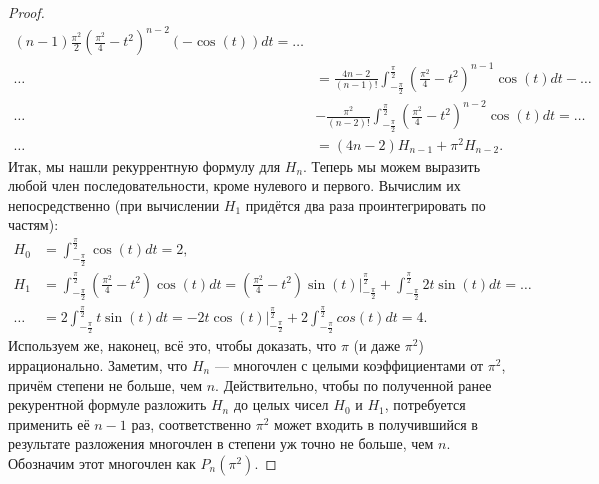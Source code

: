 \begin{proof}
\begin{align*}
		(n - 1) \frac{\pi^2}2 \left(\frac{\pi^2}4 - t^2 \right)^{n - 2} (-\cos(t)) dt = \ldots \\
		\ldots &= \frac{4n - 2}{(n - 1)!} \int_{-\frac\pi2}^{\frac\pi2}
		\left(\frac{\pi^2}4 - t^2 \right)^{n - 1} \cos(t) dt - \ldots \\
		\ldots &- \frac{\pi^2}{(n - 2)!} \int_{-\frac\pi2}^{\frac\pi2} \left(\frac{\pi^2}4 - t^2 \right)^{n - 2} \cos(t) dt = \ldots \\
		\ldots &= (4n - 2) H_{n - 1} + \pi^2 H_{n - 2}.
	\end{align*}
	Итак, мы нашли рекуррентную формулу для \(H_n\). Теперь мы можем выразить любой член последовательности, кроме нулевого и первого. Вычислим их непосредственно
	(при вычислении \(H_1\) придётся два раза проинтегрировать по частям):
	\begin{align*}
		H_0 &= \int_{-\frac\pi2}^{\frac\pi2} \cos(t) dt = 2, \\
		H_1 &= \int_{-\frac\pi2}^{\frac\pi2}
		\left(\frac{\pi^2}4 - t^2 \right) \cos(t) dt =
		\left(\frac{\pi^2}4 - t^2 \right) \sin(t)
		\bigg|_{-\frac\pi2}^{\frac\pi2} + \int_{-\frac\pi2}^{\frac\pi2} 2t \sin(t) dt = \ldots \\
		\ldots &= 2 \int_{-\frac\pi2}^{\frac\pi2} t \sin(t) dt = -2t \cos(t) \bigg|_{-\frac\pi2}^{\frac\pi2} + 2 \int_{-\frac\pi2}^{\frac\pi2} cos(t) dt = 4.
	\end{align*}
	Используем же, наконец, всё это, чтобы доказать, что \(\pi\) (и даже \(\pi^2\)) иррационально. Заметим, что \(H_n\) --- многочлен с целыми коэффициентами от \(\pi^2\), причём степени не больше, чем \(n\). Действительно, чтобы по полученной ранее рекурентной формуле разложить \(H_n\) до целых чисел \(H_0\) и \(H_1\), потребуется применить её \(n - 1\) раз, соответственно \(\pi^2\) может входить в получившийся в результате разложения многочлен в степени уж точно не больше, чем \(n\). Обозначим этот многочлен как \(P_n(\pi^2)\).
	

\end{proof}

